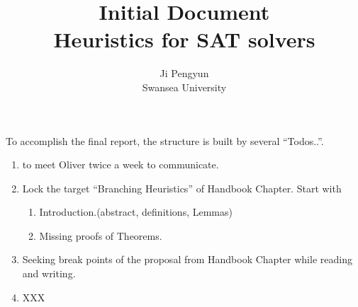 \documentclass{article}
\begin{document}
\title{Initial Document\\Heuristics for SAT solvers}
\author{Ji Pengyun\\Swansea University}

\maketitle

To accomplish the final report, the structure is built by several ``Todos..''.

  \begin{enumerate}
    \item to meet Oliver twice a week to communicate.
    \item Lock the target ``Branching Heuristics'' of Handbook Chapter. Start with
    \begin{enumerate}
      \item Introduction.(abstract, definitions, Lemmas)
      \item Missing proofs of Theorems.
    \end{enumerate}
    \item Seeking break points of the proposal from Handbook Chapter while reading and writing.
    
    \item XXX
  \end{enumerate}
  
\end{document}
